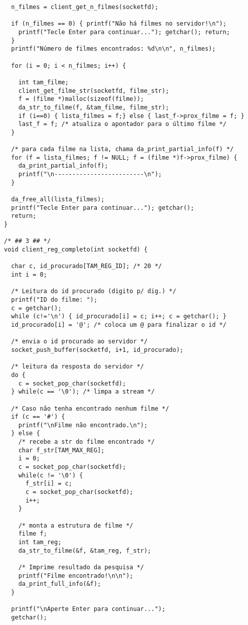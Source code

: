 \documentclass[11pt,twoside]{article}
\begin{document}
\begin{verbatim}
  n_filmes = client_get_n_filmes(socketfd);

  if (n_filmes == 0) { printf("Não há filmes no servidor!\n");
    printf("Tecle Enter para continuar..."); getchar(); return;
  }
  printf("Número de filmes encontrados: %d\n\n", n_filmes);

  for (i = 0; i < n_filmes; i++) {

    int tam_filme;
    client_get_filme_str(socketfd, filme_str);
    f = (filme *)malloc(sizeof(filme));
    da_str_to_filme(f, &tam_filme, filme_str);
    if (i==0) { lista_filmes = f;} else { last_f->prox_filme = f; }
    last_f = f; /* atualiza o apontador para o último filme */
  }
	
  /* para cada filme na lista, chama da_print_partial_info(f) */
  for (f = lista_filmes; f != NULL; f = (filme *)f->prox_filme) {
    da_print_partial_info(f);
    printf("\n-------------------------\n");
  }
	
  da_free_all(lista_filmes);
  printf("Tecle Enter para continuar..."); getchar();
  return;
}

/* ## 3 ## */
void client_reg_completo(int socketfd) {

  char c, id_procurado[TAM_REG_ID]; /* 20 */
  int i = 0;

  /* Leitura do id procurado (digito p/ dig.) */
  printf("ID do filme: ");
  c = getchar();
  while (c!='\n') { id_procurado[i] = c; i++; c = getchar(); }
  id_procurado[i] = '@'; /* coloca um @ para finalizar o id */

  /* envia o id procurado ao servidor */
  socket_push_buffer(socketfd, i+1, id_procurado);

  /* leitura da resposta do servidor */
  do {
    c = socket_pop_char(socketfd);
  } while(c == '\0'); /* limpa a stream */
  
  /* Caso não tenha encontrado nenhum filme */
  if (c == '#') {
    printf("\nFilme não encontrado.\n");
  } else {
    /* recebe a str do filme encontrado */
    char f_str[TAM_MAX_REG];
    i = 0;
    c = socket_pop_char(socketfd);
    while(c != '\0') { 
      f_str[i] = c;
      c = socket_pop_char(socketfd);
      i++;
    }

    /* monta a estrutura de filme */
    filme f;
    int tam_reg;
    da_str_to_filme(&f, &tam_reg, f_str);

    /* Imprime resultado da pesquisa */
    printf("Filme encontrado!\n\n");
    da_print_full_info(&f);
  }

  printf("\nAperte Enter para continuar...");
  getchar();


\end{verbatim}
\end{document}
